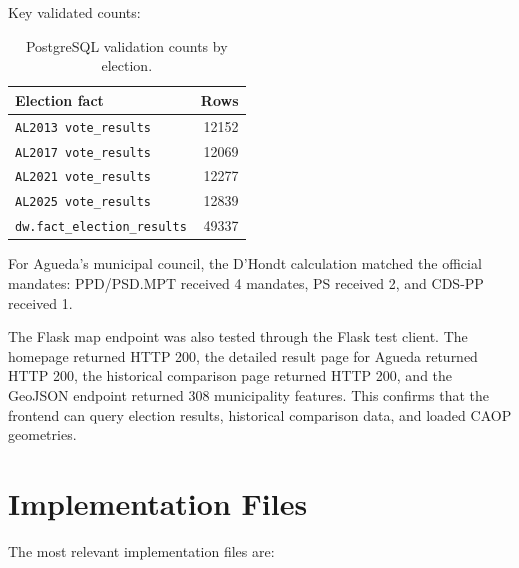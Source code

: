 \documentclass[11pt,twocolumn]{article}
\begin{document}
Key validated counts:

\begin{table}[h]
\centering
\caption{PostgreSQL validation counts by election.}
\begin{tabular}{lr}
\toprule
Election fact & Rows\\
\midrule
\texttt{AL2013 vote\_results} & 12152\\
\texttt{AL2017 vote\_results} & 12069\\
\texttt{AL2021 vote\_results} & 12277\\
\texttt{AL2025 vote\_results} & 12839\\
\texttt{dw.fact\_election\_results} & 49337\\
\bottomrule
\end{tabular}
\end{table}

For Agueda's municipal council, the D'Hondt calculation matched the official mandates: PPD/PSD.MPT received 4 mandates, PS received 2, and CDS-PP received 1.

The Flask map endpoint was also tested through the Flask test client. The homepage returned HTTP 200, the detailed result page for Agueda returned HTTP 200, the historical comparison page returned HTTP 200, and the GeoJSON endpoint returned 308 municipality features. This confirms that the frontend can query election results, historical comparison data, and loaded CAOP geometries.

\section{Implementation Files}

The most relevant implementation files are:
\end{document}
